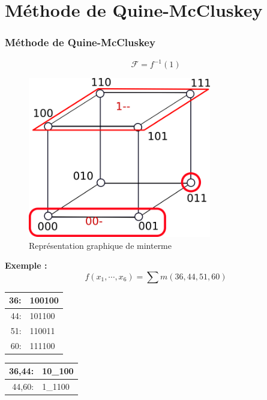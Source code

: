 \documentclass[handout]{beamer}
\newcommand{\tick}{\ding{52}}
\begin{document}
\section{M\'ethode de Quine-McCluskey}
\begin{frame}
  \frametitle{M\'ethode de Quine-McCluskey}

  \[ \mathcal{F} = f^{-1}({1}) \]
  
  \begin{figure}[p]
    \includegraphics[width=8cm]{cube_qm.png}
    \caption{Repr\'esentation graphique de minterme}
    \label{fig:cube1}
  \end{figure}
  
  \large{\textbf{Exemple :}} \[ f(x_1,\cdots,x_6) = \sum m(36, 44, 51, 60) \]
  
    \begin{tabular}{rl}
      36: & 100100  \tick \\ \hline 
      44: & 101100  \tick \\ 
      51: & 110011   \\ \hline
      60: & 111100 \tick
    \end{tabular}

    \begin{tabular}{rl}
      36,44: & 10\_100  \\ \hline 
      44,60: & 1\_1100    
    \end{tabular}
  
  
  
\end{frame}
\end{document}
